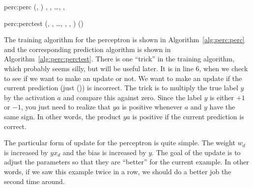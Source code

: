 \newalgorithm%
  {perc:perc}%
  {(, )}
  {
\ENDIF
\ENDFOR
\ENDFOR
\RETURN {}, , \dots, , 
}

\newalgorithm%
  {perc:perctest}%
  {(, , \dots, , , \VAR{$\hat\vx$})}
  {
\RETURN {}()
}

The training algorithm for the perceptron is shown in
Algorithm~\ref{alg:perc:perc} and the corresponding prediction
algorithm is shown in Algorithm~\ref{alg:perc:perctest}.  There is one
``trick'' in the training algorithm, which probably seems silly, but
will be useful later.  It is in line 6, when we check to see if we
want to make an update or not.  We want to make an update if the
current prediction (just ()) is incorrect.  The trick
is to multiply the true label $y$ by the activation $a$ and compare
this against zero.  Since the label $y$ is either $+1$ or $-1$, you
just need to realize that $ya$ is positive whenever $a$ and $y$ have
the same sign.  In other words, the product $ya$ is positive if the
current prediction is correct.


The particular form of update for the perceptron is quite simple.  The
weight $w_d$ is increased by $y x_d$ and the bias is increased by
$y$.  The goal of the update is to adjust the parameters so that they
are ``better'' for the current example.  In other words, if we saw
this example twice in a row, we should do a better job the second time
around.

